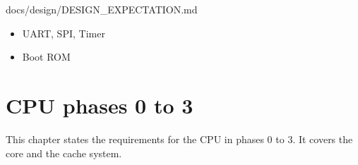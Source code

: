\begin{relocated}{docs/design/DESIGN_EXPECTATION.md}
\begin{itemize}
  \begin{itemize}
  \tightlist
  \item
    AXI as main communication protocol
  \item
    APB as config register read/\allowbreak{}write protocol
  \end{itemize}
\item
  UART, SPI, Timer
\item
  Boot ROM
\end{itemize}
\end{relocated}

\chapter{CPU phases 0 to 3}\label{ds:ch:cpu-phases-0-to-3}

This chapter states the requirements for the CPU in phases 0 to 3. It covers the core and the cache system.

